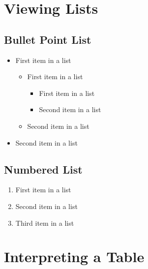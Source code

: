 \documentclass[11pt]{scrartcl} %
\begin{document}

\section{Viewing Lists}

\subsection{Bullet Point List}

\begin{itemize}
	\item First item in a list 
		\begin{itemize}
		\item First item in a list 
			\begin{itemize}
			\item First item in a list 
			\item Second item in a list 
			\end{itemize}
		\item Second item in a list 
		\end{itemize}
	\item Second item in a list 
\end{itemize}


\subsection{Numbered List}

\begin{enumerate}
	\item First item in a list 
	\item Second item in a list 
	\item Third item in a list
\end{enumerate}


\section{Interpreting a Table}
\end{document}
